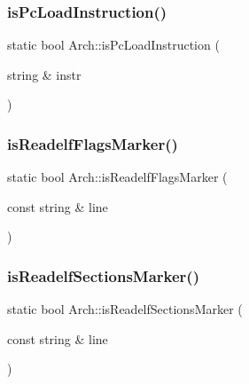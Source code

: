 \subsubsection{\texorpdfstring{is\+Pc\+Load\+Instruction()}{isPcLoadInstruction()}}
{\footnotesize\ttfamily static bool Arch\+::is\+Pc\+Load\+Instruction (\begin{DoxyParamCaption}\item[{string \&}]{instr }\end{DoxyParamCaption})\hspace{0.3cm}{\ttfamily [static]}}

\mbox{\label{classArch_a84e4dcaf28bf07bfb13486a36f303e4b}} 
\subsubsection{\texorpdfstring{is\+Readelf\+Flags\+Marker()}{isReadelfFlagsMarker()}}
{\footnotesize\ttfamily static bool Arch\+::is\+Readelf\+Flags\+Marker (\begin{DoxyParamCaption}\item[{const string \&}]{line }\end{DoxyParamCaption})\hspace{0.3cm}{\ttfamily [static]}}

\mbox{\label{classArch_a76615e9f0fe6fee36d6bc97055ce5d69}} 
\subsubsection{\texorpdfstring{is\+Readelf\+Sections\+Marker()}{isReadelfSectionsMarker()}}
{\footnotesize\ttfamily static bool Arch\+::is\+Readelf\+Sections\+Marker (\begin{DoxyParamCaption}\item[{const string \&}]{line }\end{DoxyParamCaption})\hspace{0.3cm}{\ttfamily [static]}}

\mbox{\label{classArch_ae61d5eb0785fac7962ede07c619fc0bc}} 
